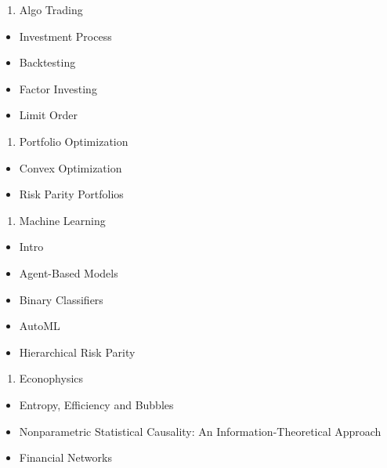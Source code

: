 \documentclass[]{book}
\providecommand{\tightlist}{%
  \setlength{\itemsep}{0pt}\setlength{\parskip}{0pt}}
\theoremstyle{definition}
\theoremstyle{definition}
\theoremstyle{definition}
\theoremstyle{remark}
\begin{document}
\begin{enumerate}
\def\labelenumi{\arabic{enumi}.}
\setcounter{enumi}{1}
\tightlist
\item
  Algo Trading
\end{enumerate}

\begin{itemize}
\tightlist
\item
  Investment Process
\item
  Backtesting
\item
  Factor Investing
\item
  Limit Order
\end{itemize}

\begin{enumerate}
\def\labelenumi{\arabic{enumi}.}
\setcounter{enumi}{2}
\tightlist
\item
  Portfolio Optimization
\end{enumerate}

\begin{itemize}
\tightlist
\item
  Convex Optimization
\item
  Risk Parity Portfolios
\end{itemize}

\begin{enumerate}
\def\labelenumi{\arabic{enumi}.}
\setcounter{enumi}{3}
\tightlist
\item
  Machine Learning
\end{enumerate}

\begin{itemize}
\tightlist
\item
  Intro
\item
  Agent-Based Models
\item
  Binary Classifiers
\item
  AutoML
\item
  Hierarchical Risk Parity
\end{itemize}

\begin{enumerate}
\def\labelenumi{\arabic{enumi}.}
\setcounter{enumi}{4}
\tightlist
\item
  Econophysics
\end{enumerate}

\begin{itemize}
\tightlist
\item
  Entropy, Efficiency and Bubbles
\item
  Nonparametric Statistical Causality: An Information-Theoretical
  Approach
\item
  Financial Networks
\end{itemize}
\end{document}
